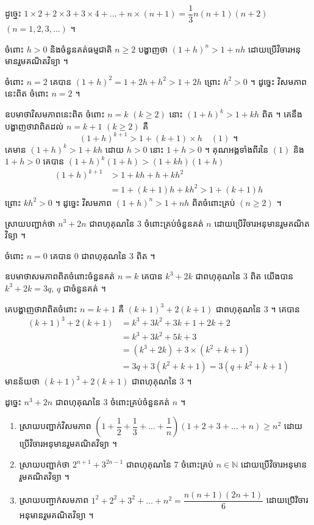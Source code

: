 ដូច្នេះ $1 \times 2 + 2 \times 3 + 3 \times 4 + \ldots + n \times (n + 1) = \dfrac{1}{3}n(n + 1)(n + 2)$ \quad $(n = 1, 2, 3, \ldots)$ ។

\begin{example}[លំហាត់គំរូ ២]
ចំពោះ $h > 0$ និងចំនួនគត់ធម្មជាតិ $n \ge 2$ បង្ហាញថា $(1 + h)^n > 1 + nh$ ដោយប្រើវិចារអនុមានរួមគណិតវិទ្យា ។
\end{example}
\ans
ចំពោះ $n = 2$ គេបាន $(1 + h)^2 = 1 + 2h + h^2 > 1 + 2h$ ព្រោះ $h^2 > 0$ ។ ដូច្នេះ វិសមភាពនេះពិត ចំពោះ $n = 2$ ។

ឧបមាថាវិសមភាពនេះពិត ចំពោះ $n = k$ $(k \ge 2)$ នោះ $(1 + h)^k > 1 + kh$ ពិត ។ គេនឹងបង្ហាញថាវាពិតដល់ $n = k + 1$ $(k \ge 2)$ គឺ
\[ (1 + h)^{k+1} > 1 + (k + 1) \times h \quad (1) \text{ ។} \]
គេមាន $(1 + h)^k > 1 + kh$ ដោយ $h > 0$ នោះ $1 + h > 0$ ។ គុណអង្គទាំងពីរនៃ $(1)$ និង $1 + h > 0$ គេបាន $(1 + h)^k(1 + h) > (1 + kh)(1 + h)$
\[
\begin{aligned}
(1 + h)^{k+1} &> 1 + kh + h + kh^2\\
&= 1 + (k + 1)h + kh^2 > 1 + (k + 1)h
\end{aligned}
\]
ព្រោះ $kh^2 > 0$ ។ ដូច្នេះ វិសមភាព $(1 + h)^n > 1 + nh$ ពិតចំពោះគ្រប់ $(n \ge 2)$ ។

\begin{example}[លំហាត់គំរូ ៣]
ស្រាយបញ្ជាក់ថា $n^3 + 2n$ ជាពហុគុណនៃ $3$ ចំពោះគ្រប់ចំនួនគត់ $n$ ដោយប្រើវិចារអនុមានរួមគណិតវិទ្យា ។
\end{example}
\ans
ចំពោះ $n = 0$ គេបាន $0$ ជាពហុគុណនៃ $3$ ពិត ។

ឧបមាថាសមភាពពិតចំពោះចំនួនគត់ $n = k$ គេបាន $k^3 + 2k$ ជាពហុគុណនៃ $3$ ពិត យើងបាន $k^3 + 2k = 3q$, $q$ ជាចំនួនគត់ ។

គេបង្ហាញថាវាពិតចំពោះ $n = k + 1$ គឺ $(k + 1)^3 + 2(k + 1)$ ជាពហុគុណនៃ $3$ ។ គេបាន
\[
\begin{aligned}
(k + 1)^3 + 2(k + 1) &= k^3 + 3k^2 + 3k + 1 + 2k + 2\\
&= k^3 + 3k^2 + 5k + 3\\
&= (k^3 + 2k) + 3 \times (k^2 + k + 1)\\
&= 3q + 3(k^2 + k + 1) = 3(q + k^2 + k + 1)
\end{aligned}
\]
មានន័យថា $(k + 1)^3 + 2(k + 1)$ ជាពហុគុណនៃ $3$ ។

ដូច្នេះ $n^3 + 2n$ ជាពហុគុណនៃ $3$ ចំពោះគ្រប់ចំនួនគត់ $n$ ។

\begin{pro}
\begin{enumerate}[a]
  \item ស្រាយបញ្ជាក់វិសមភាព $\left(1 + \dfrac{1}{2} + \dfrac{1}{3} + \ldots + \dfrac{1}{n}\right)(1 + 2 + 3 + \ldots + n) \ge n^2$ ដោយប្រើវិចារអនុមានរួមគណិតវិទ្យា ។
  \item ស្រាយបញ្ជាក់ថា $2^{n+1} + 3^{2n-1}$ ជាពហុគុណនៃ $7$ ចំពោះគ្រប់ $n \in \mathbb{N}$ ដោយប្រើវិចារអនុមានរួមគណិតវិទ្យា ។
  \item ស្រាយបញ្ជាក់សមភាព $1^2 + 2^2 + 3^2 + \ldots + n^2 = \dfrac{n(n + 1)(2n + 1)}{6}$ ដោយប្រើវិចារអនុមានរួមគណិតវិទ្យា ។
\end{enumerate}
\end{pro}

